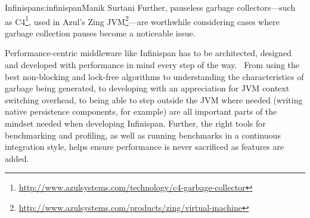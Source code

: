 \begin{aosachapter}{Infinispan}{s:infinispan}{Manik Surtani}
Further, pauseless garbage collectors---such as C4\footnote{\url{http://www.azulsystems.com/technology/c4-garbage-collector}},
used in Azul's Zing JVM\footnote{\url{http://www.azulsystems.com/products/zing/virtual-machine}}---are
worthwhile considering cases where garbage collection pauses become a
noticeable issue.


Performance-centric middleware like Infinispan has to be architected,
designed and developed with performance in mind every step of the way.
~From using the best non-blocking and lock-free algorithms to
understanding the characteristics of garbage being generated, to
developing with an appreciation for JVM context switching overhead, to
being able to step outside the JVM where needed (writing native
persistence components, for example) are all important parts of the
mindset needed when developing Infinispan. Further, the right tools for
benchmarking and profiling, as well as running benchmarks in a
continuous integration style, helps ensure performance is never
sacrificed as features are added.

\end{aosachapter}
